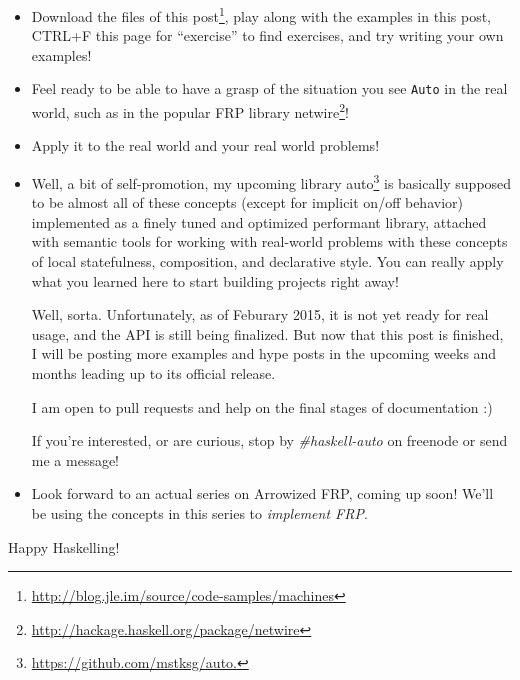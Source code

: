 \documentclass[]{article}
\renewcommand{\href}[2]{#2\footnote{\url{#1}}}
\begin{document}
\begin{itemize}
\item
  \href{http://blog.jle.im/source/code-samples/machines}{Download the files of
  this post}, play along with the examples in this post, CTRL+F this page for
  ``exercise'' to find exercises, and try writing your own examples!
\item
  Feel ready to be able to have a grasp of the situation you see \texttt{Auto}
  in the real world, such as in the popular FRP library
  \href{http://hackage.haskell.org/package/netwire}{netwire}!
\item
  Apply it to the real world and your real world problems!
\item
  Well, a bit of self-promotion, my upcoming library
  \href{https://github.com/mstksg/auto.}{auto} is basically supposed to be
  almost all of these concepts (except for implicit on/off behavior) implemented
  as a finely tuned and optimized performant library, attached with semantic
  tools for working with real-world problems with these concepts of local
  statefulness, composition, and declarative style. You can really apply what
  you learned here to start building projects right away!

  Well, sorta. Unfortunately, as of Feburary 2015, it is not yet ready for real
  usage, and the API is still being finalized. But now that this post is
  finished, I will be posting more examples and hype posts in the upcoming weeks
  and months leading up to its official release.

  I am open to pull requests and help on the final stages of documentation :)

  If you're interested, or are curious, stop by \emph{\#haskell-auto} on
  freenode or send me a message!
\item
  Look forward to an actual series on Arrowized FRP, coming up soon! We'll be
  using the concepts in this series to \emph{implement FRP}.
\end{itemize}

Happy Haskelling!
\end{document}
